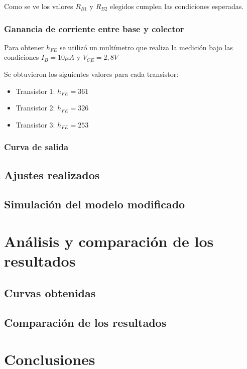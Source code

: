\documentclass[10pt,spanish,a4paper,openany,notitlepage]{article}
\begin{document}
Como se ve los valores $R_{B1}$ y $R_{B2}$ elegidos cumplen las condiciones esperadas.

\subsubsection{Ganancia de corriente entre base y colector}

Para obtener $h_{FE}$ se utilizó un multímetro que realiza la medición bajo las condiciones $I_B = 10 \unit{\mu A}$ y $V_{CE} = 2,8 \unit{V}$

Se obtuvieron los siguientes valores para cada transistor:

\begin{itemize}
\item{Transistor 1:} $h_{FE} = 361$
\item{Transistor 2:} $h_{FE} = 326$
\item{Transistor 3:} $h_{FE} = 253$
\end{itemize}

\subsubsection{Curva de salida}



\subsection{Ajustes realizados}

\subsection{Simulación del modelo modificado}

\section{Análisis y comparación de los resultados}

\subsection{Curvas obtenidas}

\subsection{Comparación de los resultados}

\section{Conclusiones}
\end{document}
